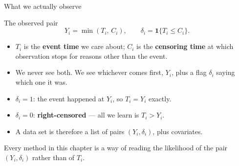 \documentclass[aspectratio=169,11pt]{beamer}
\begin{document}
\begin{frame}{What we actually observe}
  \footnotesize
  \begin{block}{The observed pair}
    \[
      \boxed{\;Y_i=\min(T_i,\,C_i),\qquad
              \delta_i=\mathbf{1}\{T_i\le C_i\}.\;}
    \]
  \end{block}
  \begin{readme}
    \begin{itemize}
      \item $T_i$ is the \textbf{event time} we care about; $C_i$ is the
            \textbf{censoring time} at which observation stops for reasons other than
            the event.
      \item We never see both. We see whichever comes first, $Y_i$, plus a flag
            $\delta_i$ saying which one it was.
      \item $\delta_i=1$: the event happened at $Y_i$, so $T_i=Y_i$ exactly.
      \item $\delta_i=0$: \textbf{right-censored} --- all we learn is $T_i>Y_i$.
      \item A data set is therefore a list of pairs $(Y_i,\delta_i)$, plus covariates.
    \end{itemize}
  \end{readme}
  \begin{takeaway}
    Every method in this chapter is a way of reading the likelihood of the pair
    $(Y_i,\delta_i)$ rather than of $T_i$.
  \end{takeaway}
\end{frame}
\end{document}
